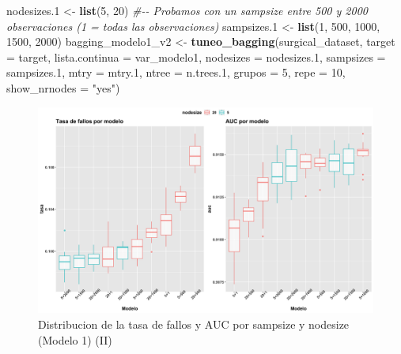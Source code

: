 \documentclass[
]{article}
\newenvironment{Shaded}{\begin{snugshade}}{\end{snugshade}}
\newcommand{\CommentTok}[1]{\textcolor[rgb]{0.56,0.35,0.01}{\textit{#1}}}
\newcommand{\DataTypeTok}[1]{\textcolor[rgb]{0.13,0.29,0.53}{#1}}
\newcommand{\DecValTok}[1]{\textcolor[rgb]{0.00,0.00,0.81}{#1}}
\newcommand{\FloatTok}[1]{\textcolor[rgb]{0.00,0.00,0.81}{#1}}
\newcommand{\KeywordTok}[1]{\textcolor[rgb]{0.13,0.29,0.53}{\textbf{#1}}}
\newcommand{\NormalTok}[1]{#1}
\newcommand{\StringTok}[1]{\textcolor[rgb]{0.31,0.60,0.02}{#1}}
\begin{document}
\begin{Shaded}
\begin{Highlighting}[]
\NormalTok{nodesizes}\FloatTok{.1}\NormalTok{ <{-}}\StringTok{ }\KeywordTok{list}\NormalTok{(}\DecValTok{5}\NormalTok{, }\DecValTok{20}\NormalTok{)}
\CommentTok{\#{-}{-} Probamos con un sampsize entre 500 y 2000 observaciones (1 = todas las observaciones)}
\NormalTok{sampsizes}\FloatTok{.1}\NormalTok{ <{-}}\StringTok{ }\KeywordTok{list}\NormalTok{(}\DecValTok{1}\NormalTok{, }\DecValTok{500}\NormalTok{, }\DecValTok{1000}\NormalTok{, }\DecValTok{1500}\NormalTok{, }\DecValTok{2000}\NormalTok{)}
\NormalTok{bagging\_modelo1\_v2 <{-}}\StringTok{ }\KeywordTok{tuneo\_bagging}\NormalTok{(surgical\_dataset, }\DataTypeTok{target =}\NormalTok{ target,}
                                    \DataTypeTok{lista.continua =}\NormalTok{ var\_modelo1,}
                                    \DataTypeTok{nodesizes =}\NormalTok{ nodesizes}\FloatTok{.1}\NormalTok{,}
                                    \DataTypeTok{sampsizes =}\NormalTok{ sampsizes}\FloatTok{.1}\NormalTok{, }\DataTypeTok{mtry =}\NormalTok{ mtry}\FloatTok{.1}\NormalTok{,}
                                    \DataTypeTok{ntree =}\NormalTok{ n.trees}\FloatTok{.1}\NormalTok{, }\DataTypeTok{grupos =} \DecValTok{5}\NormalTok{, }\DataTypeTok{repe =} \DecValTok{10}\NormalTok{,}
                                    \DataTypeTok{show\_nrnodes =} \StringTok{"yes"}\NormalTok{)}
\end{Highlighting}
\end{Shaded}

\begin{figure}[h!]

{\centering \includegraphics[width=0.99\linewidth,height=0.99\textheight,]{./charts/03_distribucion_auc_tasa_fallos_modelo1_comp} 

}

\caption{Distribucion de la tasa de fallos y AUC por sampsize y nodesize (Modelo 1) (II)}\label{fig:unnamed-chunk-71}
\end{figure}
\end{document}
